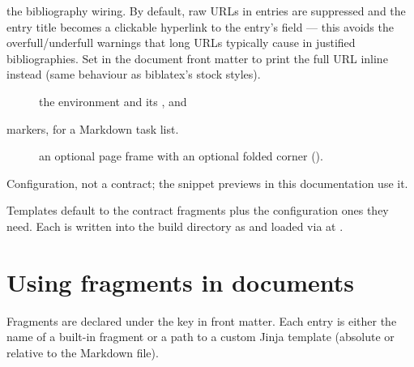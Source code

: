 \documentclass[a4paper,twoside]{article}
\begin{document}
the bibliography wiring. By default, raw URLs in entries are suppressed and
the entry title becomes a clickable hyperlink to the entry's  field ---
this avoids the overfull/underfull  warnings that long URLs typically
cause in justified bibliographies. Set  in the
document front matter to print the full URL inline instead (same behaviour
as biblatex's stock styles).
\begin{description}
\item[{}] the  environment and its ,  and 
\end{description}
markers, for a Markdown task list.
\begin{description}
\item[{}] an optional page frame with an optional folded corner ().
\end{description}
Configuration, not a contract; the snippet previews in this documentation use
it.

Templates default to the contract fragments plus the configuration ones they
need. Each is written into the build directory as  and loaded via
 at .
\section{Using fragments in documents}
Fragments are declared under the  key in front matter. Each
entry is either the name of a built-in fragment or a path to a custom Jinja
template (absolute or relative to the Markdown file).
\end{document}
